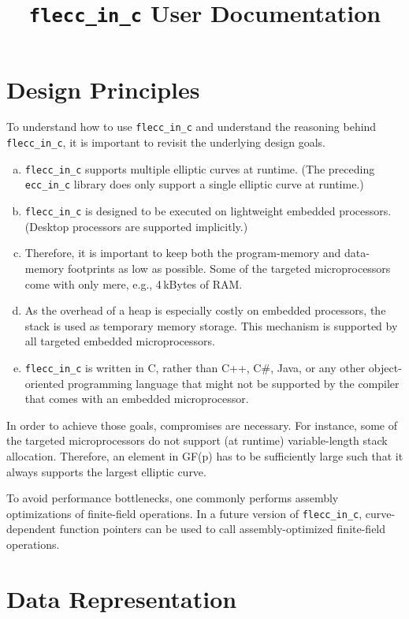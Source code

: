 \documentclass[runningheads]{llncs}
\title{\texttt{flecc\_in\_c} User Documentation}
\author{}
\institute{ Stiftung Secure Information and Communication Technologies, \\ Inffeldgasse 16a, 8010 Graz, Austria \\
\vspace{0.3cm}
Version 1.1, \today}
\begin{document}
\maketitle

\section{Design Principles}

To understand how to use \texttt{flecc\_in\_c} and understand the reasoning behind \texttt{flecc\_in\_c}, it is important to revisit the underlying design goals. 

\begin{enumerate}[(a)]
\item \texttt{flecc\_in\_c} supports multiple elliptic curves at runtime. (The preceding \texttt{ecc\_in\_c} library does only support a single elliptic curve at runtime.)
\item \texttt{flecc\_in\_c} is designed to be executed on lightweight embedded processors. (Desktop processors are supported implicitly.) 
\item Therefore, it is important to keep both the program-memory and data-memory footprints as low as possible. Some of the targeted microprocessors come with only mere, e.g., 4\,kBytes of RAM.
\item As the overhead of a heap is especially costly on embedded processors, the stack is used as temporary memory storage. This mechanism is supported by all targeted embedded microprocessors.
\item \texttt{flecc\_in\_c} is written in C, rather than C++, C\#, Java, or any other object-oriented programming language that might not be supported by the compiler that comes with an embedded microprocessor.
\end{enumerate}

In order to achieve those goals, compromises are necessary. For instance, some of the targeted microprocessors do not support (at runtime) variable-length stack allocation. Therefore, an element in GF(p) has to be sufficiently large such that it always supports the largest elliptic curve. 

To avoid performance bottlenecks, one commonly performs assembly optimizations of finite-field operations. In a future version of \texttt{flecc\_in\_c}, curve-dependent function pointers can be used to call assembly-optimized finite-field operations.  

\section{Data Representation}
\end{document}
